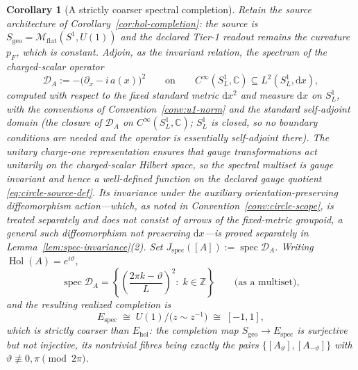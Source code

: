 \documentclass[11pt,a4paper]{article}
\theoremstyle{plain}
\newtheorem{corollary}[theorem]{Corollary}
\theoremstyle{definition}
\theoremstyle{remark}
\newcommand{\Int}{\mathbb{Z}}
\newcommand{\Cx}{\mathbb{C}}
\newcommand{\Sgeo}{S_{\mathrm{geo}}}
\newcommand{\Hol}{\operatorname{Hol}}
\newcommand{\Mflat}{\mathcal{M}_{\mathrm{flat}}}
\begin{document}
\begin{corollary}[A strictly coarser spectral completion]
\label{cor:spec}
Retain the source architecture of Corollary~\ref{cor:hol-completion}: the source is
$\Sgeo=\Mflat(S^1,U(1))$ and the declared Tier-1 readout remains the curvature $p_F$, which is
constant. Adjoin, as the invariant relation, the spectrum of the charged-scalar operator
\begin{equation}
\label{eq:Dop}
\mathcal{D}_A:=-\bigl(\partial_x-i\,a(x)\bigr)^{2}
\qquad\text{on}\qquad
C^\infty(S^1_L,\Cx)\subseteq L^2(S^1_L,\mathrm{d}x),
\end{equation}
computed with respect to the fixed standard metric $\mathrm{d}x^2$ and measure $\mathrm{d}x$ on
$S^1_L$, with the conventions of Convention~\ref{conv:u1-norm} and the standard self-adjoint
domain (the closure of $\mathcal{D}_A$ on $C^\infty(S^1_L,\Cx)$; $S^1_L$ is closed, so no boundary
conditions are needed and the operator is essentially self-adjoint there). The unitary charge-one
representation ensures that gauge transformations act unitarily on the charged-scalar Hilbert
space, so the spectral multiset is gauge invariant and hence a well-defined function on the declared
gauge quotient \eqref{eq:circle-source-def}. Its invariance under the auxiliary
orientation-preserving diffeomorphism action---which, as noted in Convention~\ref{conv:circle-scope},
is treated separately and does not consist of arrows of the fixed-metric groupoid, a general such
diffeomorphism not preserving $\mathrm{d}x$---is proved separately in
Lemma~\ref{lem:spec-invariance}(2). Set
$J_{\mathrm{spec}}([A]):=\operatorname{spec}\mathcal{D}_A$. Writing $\Hol(A)=e^{i\vartheta}$,
\begin{equation}
\label{eq:spec}
\operatorname{spec}\mathcal{D}_A
=\left\{
\left(\frac{2\pi k-\vartheta}{L}\right)^{\!2}
:\; k\in\Int
\right\}
\qquad\text{(as a multiset)} ,
\end{equation}
and the resulting realized completion is
\begin{equation}
\label{eq:Espec}
E_{\mathrm{spec}}
\;\cong\;
U(1)\big/\bigl(z\sim z^{-1}\bigr)
\;\cong\;
[-1,1],
\end{equation}
which is \emph{strictly coarser} than $E_{\mathrm{hol}}$: the completion map
$\Sgeo\to E_{\mathrm{spec}}$ is surjective but not injective, its nontrivial fibres being exactly
the pairs $\{[A_\vartheta],[A_{-\vartheta}]\}$ with $\vartheta\not\equiv 0,\pi\pmod{2\pi}$.
\end{corollary}
\end{document}
